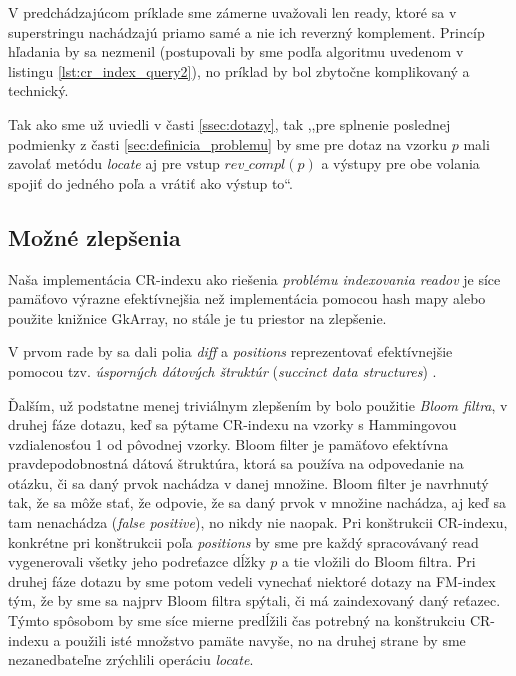 \begin{pozn}
V predchádzajúcom príklade sme zámerne uvažovali len ready, ktoré sa v superstringu nachádzajú priamo samé a nie ich reverzný komplement. Princíp hľadania by sa nezmenil (postupovali by sme podľa algoritmu uvedenom v listingu \ref{lst:cr_index_query2}), no príklad by bol zbytočne komplikovaný a technický.
\end{pozn}

\begin{pozn}
Tak ako sme už uviedli v časti \ref{ssec:dotazy}, tak ,,pre splnenie poslednej podmienky z časti \ref{sec:definicia_problemu} by sme pre dotaz na vzorku $p$ mali zavolať metódu \emph{locate} aj pre vstup $rev\_compl(p)$ a výstupy pre obe volania spojiť do jedného poľa a vrátiť ako výstup to``.\end{pozn}

\subsection{Možné zlepšenia}
\label{ssec:mozne_zlepsenia}
Naša implementácia CR-indexu ako riešenia \emph{problému indexovania readov} je síce pamäťovo výrazne efektívnejšia než implementácia pomocou hash mapy alebo použite knižnice GkArray, no stále je tu priestor na zlepšenie.

V prvom rade by sa dali polia \emph{diff} a \emph{positions} reprezentovať efektívnejšie pomocou tzv. \emph{úsporných dátových štruktúr} (\emph{succinct data structures}) \cite{GBMP14}.

Ďalším, už podstatne menej triviálnym zlepšením by bolo použitie \emph{Bloom filtra}, v druhej fáze dotazu, keď sa pýtame CR-indexu na vzorky s Hammingovou vzdialenosťou 1 od pôvodnej vzorky. Bloom filter je pamäťovo efektívna pravdepodobnostná dátová štruktúra, ktorá sa používa na odpovedanie na otázku, či sa daný prvok nachádza v danej množine. Bloom filter je navrhnutý tak, že sa môže stať, že odpovie, že sa daný prvok v množine nachádza, aj keď sa tam nenachádza (\emph{false positive}), no nikdy nie naopak. Pri konštrukcii CR-indexu, konkrétne pri konštrukcii poľa \emph{positions} by sme pre každý spracovávaný read vygenerovali všetky jeho podreťazce dĺžky $p$ a tie vložili do Bloom filtra. Pri druhej fáze dotazu by sme potom vedeli vynechať niektoré dotazy na FM-index tým, že by sme sa najprv Bloom filtra spýtali, či má zaindexovaný daný reťazec. Týmto spôsobom by sme síce mierne predĺžili čas potrebný na konštrukciu CR-indexu a použili isté množstvo pamäte navyše, no na druhej strane by sme nezanedbateľne zrýchlili operáciu \emph{locate}.